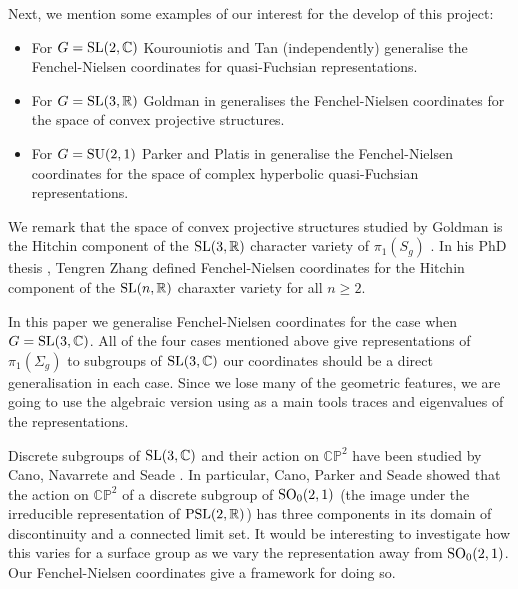 \documentclass[11pt]{amsart}
\numberwithin{equation}{section}
\begin{document}
Next, we mention some examples of our interest for the develop of this project:

\begin{itemize}
	\item For $G={\rm SL}(2,\mathbb{C})$ Kourouniotis \cite{Kou} and Tan \cite{Tan} (independently) generalise the 
	Fenchel-Nielsen coordinates for quasi-Fuchsian representations.
	
	\item For $G={\rm SL}(3,\mathbb{R})$ Goldman in \cite{Gol} generalises the Fenchel-Nielsen coordinates for the 
	space of convex projective structures.
	
	\item For $G={\rm SU}(2,1)$ Parker and Platis in \cite{PP} generalise the Fenchel-Nielsen coordinates for the 
	space of complex hyperbolic quasi-Fuchsian representations.
\end{itemize}

We remark that the space of convex projective structures studied by Goldman is the Hitchin component of
the ${\rm SL}(3,{\mathbb R})$ character variety of $\pi_1(S_g)$ \cite{Choi-Gol}. In his PhD thesis \cite{Zhang}, Tengren Zhang 
defined Fenchel-Nielsen coordinates for the Hitchin component of the ${\rm SL}(n,{\mathbb R})$ charaxter variety for all
$n\ge 2$.

In this paper we generalise Fenchel-Nielsen coordinates for the case when $G={\rm SL}(3,\mathbb{C})$. All of the four 
cases mentioned 
above give representations of $\pi_1(\Sigma_g)$ to subgroups of ${\rm SL}(3,\mathbb{C})$ our coordinates should be a direct 
generalisation in each case. Since we lose many of the geometric features, we are going to use the algebraic version using as a 
main tools traces and eigenvalues of the representations. 

Discrete subgroups of ${\rm SL}(3,{\mathbb C})$ and their
action on ${\mathbb C}{\mathbb P}^2$ have been studied by Cano, Navarrete and Seade \cite{C-N-S}. 
In particular, Cano, Parker and Seade \cite{C-P-S} showed that  the action on ${\mathbb C}{\mathbb P}^2$ of a discrete 
subgroup of ${\rm SO}_0(2,1)$ (the image under the irreducible representation of ${\rm PSL}(2,{\mathbb R})$) has
three components in its domain of discontinuity and a connected limit set. It would be interesting to investigate how
this varies for a surface group as we vary the representation away from ${\rm SO}_0(2,1)$. Our Fenchel-Nielsen
coordinates give a framework for doing so.
\end{document}
